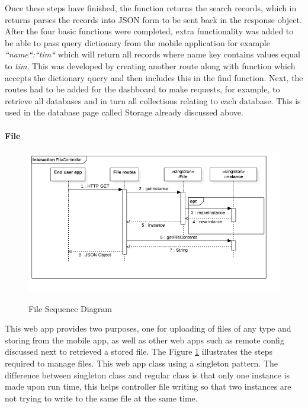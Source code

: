 Once these steps have finished, the function returns the search records, which in returns parses the records into JSON form to be sent back in the response object. After the four basic functions were completed, extra functionality was added to be able to pass query dictionary from the mobile application for example \textit{{``name``:``tim``}} which will return all records where name key contains values equal to \textit{tim}. This was developed by creating another route along with function which accepts the dictionary query and then includes this in the find function. Next, the routes had to be added for the dashboard to make requests, for example, to retrieve all databases and in turn all collections relating to each database. This is used in the database page called Storage already discussed above.

\paragraph{File}

\begin{figure}[!h]
    \caption{File Sequence Diagram}
    \centering
    \includegraphics[width=150mm]{images/sequence/FileController}
    \label{fig:file-seq}
\end{figure}

This web app provides two purposes, one for uploading of files of any type and storing from the mobile app, as well as other web apps such as remote config discussed next to retrieved a stored file. The Figure \ref{fig:file-seq} illustrates the steps required to manage files. This web app class using a singleton pattern. The difference between singleton class and regular class is that only one instance is made upon run time, this helps controller file writing so that two instances are not trying to write to the same file at the same time.

